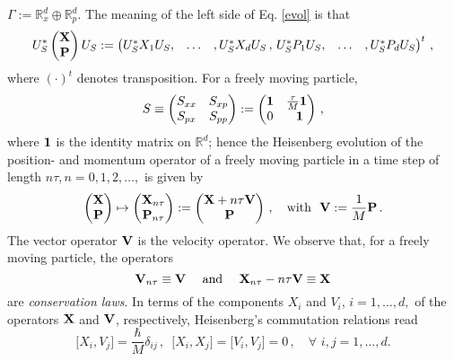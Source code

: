 \documentclass[11pt]{article}
\begin{document}
$\Gamma:=\mathbb{R}^{d}_{x} \oplus \mathbb{R}^{d}_{p}$. 
The meaning of the left side of Eq. \eqref{evol} is that 
$$U_{S}^{*} \begin{pmatrix}{\bf{X}}\\{\bf{P}}\end{pmatrix} U_{S} := 
\begin{pmatrix}U_{S}^{*}X_1 U_{S},&\dots&,U_{S}^{*}X_d U_{S}\,,\,U_{S}^{*}P_1 U_{S},&\dots&,U_{S}^{*}P_{d} U_{S}              \end{pmatrix}^{t}\,,$$  
where $(\cdot)^{t}$ denotes transposition. For a freely moving particle,
\begin{equation}
S\equiv \begin{pmatrix} S_{xx}&S_{xp}\\ S_{px}& S_{pp} \end{pmatrix} :=\begin{pmatrix} {\bf{1}} & \frac{\tau}{M} {\bf{1}}\\
0&\,\, \,{\bf{1}}\end{pmatrix}\,,
\end{equation}
where ${\bf{1}}$ is the identity matrix on $\mathbb{R}^{d}$; hence the Heisenberg evolution of the position- and momentum operator of a freely moving particle in a time step of length $n\tau, n=0, 1, 2, \dots,$ is given by
\begin{equation}\label{Heisenberg}
\begin{pmatrix}{\bf{X}}\\{\bf{P}}\end{pmatrix} \mapsto \begin{pmatrix}{\bf{X}}_{n\tau}\\ {\bf{P}}_{n\tau} \end{pmatrix} := 
\begin{pmatrix}{\bf{X}}+ n \tau {\bf{V}}\\{\bf{P}}\end{pmatrix}\,, \quad \text{with  }\,\, {\bf{V}}:= \frac{1}{M}{\bf{P}}\,.
\end{equation}
The vector operator ${\bf{V}}$ is the velocity operator. We observe that, for a freely moving particle, the operators
\begin{equation}\label{conserved}
{\bf{V}}_{n\tau} \equiv {\bf{V}} \quad \text{ and } \quad {\bf{X}}_{n\tau} - n\tau {\bf{V}}\equiv {\bf{X}}
\end{equation}
are \textit{conservation laws}.
In terms of the components $X_i$ and $V_i$, $i=1,\dots, d,$ of the operators ${\bf{X}}$ and ${\bf{V}}$, respectively, Heisenberg's commutation relations read
\begin{equation}\label{CCR}
\big[X_i, V_j\big]=  \frac{\hbar}{M} \delta_{ij}\,, \,\, \,\big[X_i, X_j\big]=\big[V_i, V_j\big]=0\,, \quad \forall\,\, i, j= 1,\dots, d.
\end{equation}
\end{document}
